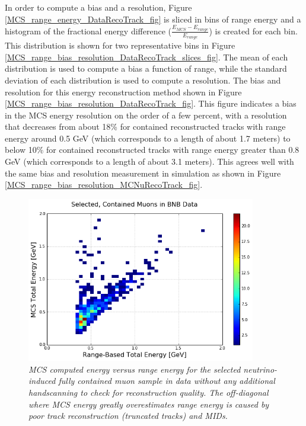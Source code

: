 In order to compute a bias and a resolution, Figure \ref{MCS_range_energy_DataRecoTrack_fig} is sliced in bins of range energy and a histogram of the fractional energy difference ($\frac{E_{MCS} - E_{range}}{E_{range}}$) is created for each bin. This distribution is shown for two representative bins in Figure \ref{MCS_range_bias_resolution_DataRecoTrack_slices_fig}. The mean of each distribution is used to compute a bias a function of range, while the standard deviation of each distribution is used to compute a resolution. The bias and resolution for this energy reconstruction method shown in Figure \ref{MCS_range_bias_resolution_DataRecoTrack_fig}. This figure indicates a bias in the MCS energy resolution on the order of a few percent, with a resolution that decreases from about 18\% for contained reconstructed tracks with range energy around 0.5 GeV (which corresponds to a length of about 1.7 meters) to below 10\% for contained reconstructed tracks with range energy greater than 0.8 GeV (which corresponds to a length of about 3.1 meters). This agrees well with the same bias and resolution measurement in simulation as shown in Figure \ref{MCS_range_bias_resolution_MCNuRecoTrack_fig}.


\begin{figure}[h!]
\begin{center}
\includegraphics[width=100mm]{Figures/MCS_range_comparison_DataRecoTracks_nohandscan.png}
\end{center}
\caption{\textit{MCS computed energy versus range energy for the selected neutrino-induced fully contained muon sample in data without any additional handscanning to check for reconstruction quality. The off-diagonal where MCS energy greatly overestimates range energy is caused by poor track reconstruction (truncated tracks) and MIDs.}}
\label{MCS_range_energy_DataRecoTrack_nohandscan_fig}
\end{figure}

